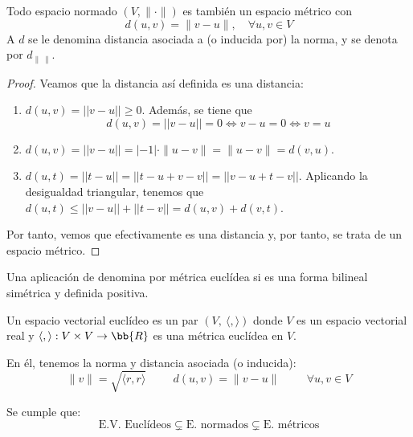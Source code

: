\begin{prop}
    Todo espacio normado $(V,\|\cdot\|)$ es también un espacio métrico con $$d(u,v)=\|v-u\|,\quad \forall u,v\in V$$
    A $d$ se le denomina distancia asociada a (o inducida por) la norma, y se denota por $d_{\|~\|}$.
\end{prop}
\begin{proof}
    Veamos que la distancia así definida es una distancia:
    \begin{enumerate}
        \item $d(u,v)=||v-u||\geq 0$. Además, se tiene que $$d(u,v)=||v-u||=0\Longleftrightarrow v-u=0 \Longleftrightarrow v=u$$
        \item $d(u,v)=||v-u||=|-1|\cdot \|u-v\| = \|u-v\| = d(v,u)$.
        \item $d(u,t)=||t-u|| = ||t-u+v-v|| = ||v-u +t-v||$. Aplicando la desigualdad triangular, tenemos que $d(u,t)\leq ||v-u|| + ||t-v|| = d(u,v) + d(v,t)$.
    \end{enumerate}
    Por tanto, vemos que efectivamente es una distancia y, por tanto, se trata de un espacio métrico.
\end{proof}

\begin{definicion}
    Una aplicación de denomina por métrica euclídea si es una forma bilineal simétrica y definida positiva.
\end{definicion}

\begin{definicion} Un espacio vectorial euclídeo es un par $(V,~\langle,\rangle)$ donde $V$ es un espacio vectorial real y $\langle,\rangle:V\times V\to \bb{R}$ es una métrica euclídea en $V$.

En él, tenemos la norma y distancia asociada (o inducida):
$$\|v\|=\sqrt{\langle r,r\rangle}\hspace{1cm}d(u,v)=\|v-u\| \hspace{1cm} \forall u,v\in V$$
\end{definicion}

\begin{observacion}
    Se cumple que:
    \begin{equation*}
        \text{E.V. Euclídeos} \subsetneq
        \text{E. normados} \subsetneq
        \text{E. métricos}
    \end{equation*}
\end{observacion}

